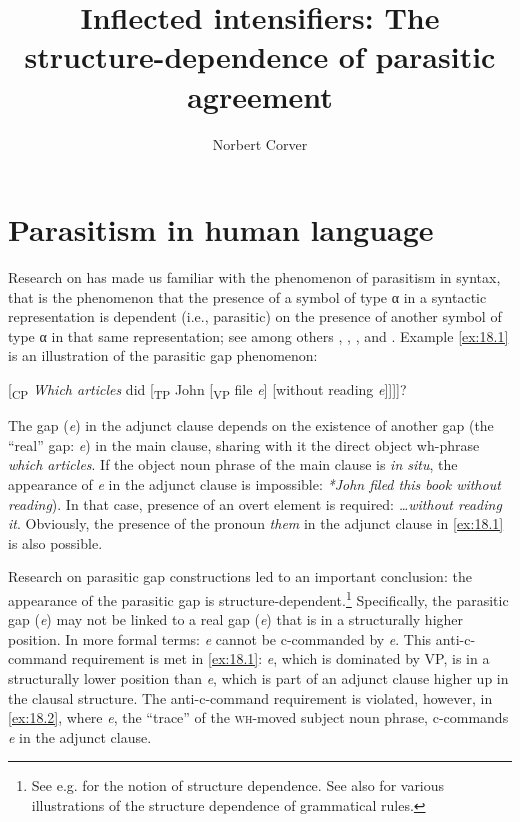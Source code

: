 \documentclass[output=paper]{langsci/langscibook}
\author{Norbert Corver\affiliation{Utrecht Institute of Linguistics-OTS,
Utrecht University}}
\title{Inflected intensifiers:\newlineCover{} The structure-dependence of parasitic agreement}
\begin{document}
\glsresetall
\maketitle


\section{Parasitism in human language}

Research on  has made us familiar with the phenomenon of
parasitism in syntax, that is the phenomenon that the presence of a symbol of
type α in a syntactic representation is dependent (i.e., parasitic) on the
presence of another symbol of type α in that same representation; see among
others \textcite{Ross1967}, \textcite{Taraldsen1981}, \textcite{Chomsky1982},
and \textcite{Engdahl:1983}. Example \eqref{ex:18.1} is an illustration of the
parasitic gap phenomenon:

\ea%
    \label{ex:18.1}
    {}[\textsubscript{CP} \emph{Which articles} did [\textsubscript{TP} John
    [\textsubscript{VP} file \emph{e}\textsubscript{\Rg{}}] [without
    reading \emph{e}\textsubscript{\Pg{}}]]]]?
\z

The gap (\emph{e}\textsubscript{\Pg{}}) in the adjunct clause depends on the
existence of another gap (the \enquote{real} gap: \emph{e}\textsubscript{\Rg{}}) in the
main clause, sharing with it the direct object wh-phrase \emph{which articles}.
If the object noun phrase of the main clause is \emph{in situ}, the appearance
of \emph{e}\textsubscript{\Pg{}} in the adjunct clause is impossible:
\emph{*John filed this book without reading}). In that case, presence of an
overt element is required: \emph{\dots{}without reading it}. Obviously,
the presence of the pronoun \emph{them} in the adjunct clause in
\eqref{ex:18.1} is also possible.

Research on parasitic gap constructions led to an important conclusion: the
appearance of the parasitic gap is structure-dependent.\footnote{See e.g.
    \citet{Chomsky1975} for the notion of structure dependence. See also
    \citet{EveraertEtAl2015} for various illustrations of the structure
dependence of grammatical rules.} Specifically, the parasitic gap
(\emph{e}\textsubscript{\Pg{}}) may not be linked to a real gap
(\emph{e}\textsubscript{\Rg{}}) that is in a structurally higher position.  In
more formal terms: \emph{e}\textsubscript{\Pg{}} cannot be c-commanded by
\emph{e}\textsubscript{\Rg{}}. This anti-c-command requirement is met in
\eqref{ex:18.1}: \emph{e}\textsubscript{\Rg{}}, which is dominated by VP, is in
a structurally lower position than \emph{e}\textsubscript{\Pg{}}, which is part
of an adjunct clause higher up in the clausal structure. The anti-c-command
requirement is violated, however, in \eqref{ex:18.2}, where
\emph{e}\textsubscript{\Rg{}}, the \enquote{trace} of the \textsc{wh}-moved subject
noun phrase, c-commands \emph{e}\textsubscript{\Pg{}} in the adjunct clause.
\end{document}
